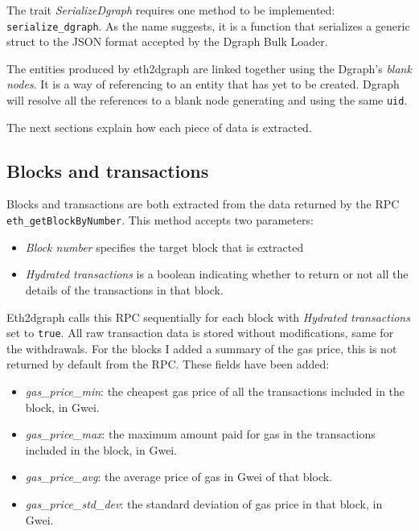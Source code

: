 The trait \textit{SerializeDgraph} requires one method to be implemented:\\ \texttt{serialize\_dgraph}. As the name suggests, it is a function that serializes a generic struct to the JSON format accepted by the Dgraph Bulk Loader.

The entities produced by eth2dgraph are linked together using the Dgraph's \textit{blank nodes}. It is a way of referencing to an entity that has yet to be created. Dgraph will resolve all the references to a blank node generating and using the same \texttt{uid}.

The next sections explain how each piece of data is extracted.

\subsection{Blocks and transactions}

Blocks and transactions are both extracted from the data returned by the RPC \texttt{eth\_getBlockByNumber}. 
This method accepts two parameters:

\begin{itemize}
    \item \textit{Block number} specifies the target block that is extracted
    \item \textit{Hydrated transactions} is a boolean indicating whether to return or not all the details of the transactions in that block.
\end{itemize}

Eth2dgraph calls this RPC sequentially for each block with \textit{Hydrated transactions} set to \texttt{true}. All raw transaction data is stored without modifications, same for the withdrawals. For the blocks I added a summary of the gas price, this is not returned by  default from the RPC. These fields have been added: 

\begin{itemize}
    \item \textit{gas\_price\_min}: the cheapest gas price of all the transactions included in the block, in Gwei.
    \item \textit{gas\_price\_max}: the maximum amount paid for gas in the transactions included in the block, in Gwei.
    \item \textit{gas\_price\_avg}: the average price of gas in Gwei of that block.
    \item \textit{gas\_price\_std\_dev}: the standard deviation of gas price in that block, in Gwei.
\end{itemize}

